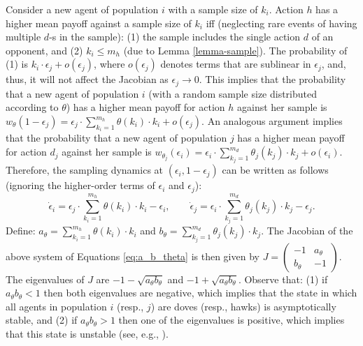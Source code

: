 \documentclass[12pt]{article}
\numberwithin{equation}{section}
\numberwithin{figure}{section}
\theoremstyle{definition}
\theoremstyle{plain}
\theoremstyle{plain}
\theoremstyle{plain}
\theoremstyle{remark}
\theoremstyle{plain}
\theoremstyle{plain}
\begin{document}
 Consider a new agent of population
$i$ with a sample size of $k_{i}.$ Action $h$ has a higher mean
payoff against a sample size of $k_{i}$ iff (neglecting rare events
of having multiple $d$-s in the sample): (1) the sample includes the single action $d$ of an opponent, and (2) $k_{i}\leq m_{h}$
 (due to Lemma \ref{lemma-sample}). The probability of (1) is $k_{i}\cdot\epsilon_{j}+o(\epsilon_{j})$,
where $o(\epsilon_{j})$ denotes terms that are sublinear in $\epsilon_{j}$,
and, thus, it will not affect the Jacobian as $\epsilon_{j}\rightarrow0$.
This implies that the probability that a new agent of population $i$
(with a random sample size distributed according to $\theta$)
has a higher mean payoff for action $h$ against her sample is
$w_{\theta}(1-\epsilon_{j})=\epsilon_{j}\cdot\sum_{k_{i}=1}^{m_{h}}\theta(k_i)\cdot k_{i}+o(\epsilon_{j})$.
An analogous argument implies that the probability that a new agent
of population $j$ has a higher mean payoff for action $d_{j}$ against
her sample is $w_{\theta_{j}}(\epsilon_{i})=\epsilon_{i}\cdot\sum_{k_{j}=1}^{m_{d}}\theta_{j}(k_j)\cdot k_{j}+o(\epsilon_{i})$.
Therefore, the sampling dynamics at $(\epsilon_{i},1-\epsilon_{j})$
can be written as follows (ignoring the higher-order terms
of $\epsilon_{i}$ and $\epsilon_{j}$):
\begin{equation}
\dot{\epsilon}_{i}=\epsilon_{j}\cdot\sum_{k_{i}=1}^{m_{h}}\theta(k_i)\cdot k_{i}-\epsilon_{i},\,\,\,\,\,\,\,\,\,\,\,\,\dot{\epsilon}_{j}=\epsilon_{i}\cdot\sum_{k_{j}=1}^{m_{d}}\theta_{j}(k_j)\cdot k_{j}-\epsilon_{j}.\label{eq:a_b_theta}
\end{equation}
Define: $a_{\theta}=\sum_{k_{i}=1}^{m_{h}}\theta(k_i)\cdot k_{i}$
and $b_{\theta}=\sum_{k_{j}=1}^{m_{d}}\theta_{j}(k_j)\cdot k_{j}$.
The Jacobian of the above system of Equations \eqref{eq:a_b_theta}
is then given by $J=\left(\begin{array}{cc}
-1 & a_{\theta}\\
b_{\theta} & -1
\end{array}\right).$ The eigenvalues of $J$ are $-1-\sqrt{a_{\theta}b_{\theta}}$
and $-1+\sqrt{a_{\theta}b_{\theta}}.$ Observe that:
(1) if $a_{\theta}b_{\theta}<1$ then both eigenvalues
are negative, which implies that the state in which
all agents in population $i$ (resp., $j$) are doves (resp., hawks) is asymptotically
stable, and (2) if $a_{\theta}b_{\theta}>1$ then
one of the eigenvalues is positive, which implies that this state is unstable (see, e.g., \citealp[Theorems 1--2 in Section 2.9]{perko2013differential}).
\end{document}
